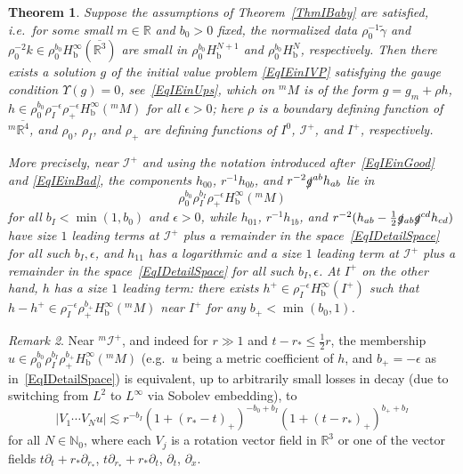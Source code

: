 \documentclass[reqno,11pt,letterpaper]{amsart}
\numberwithin{equation}{section}
\numberwithin{figure}{section}
\newtheorem{thm}{Theorem}[section]
\theoremstyle{definition}
\theoremstyle{remark}
\newtheorem{rmk}[thm]{Remark}
\newcommand{\ms}{\mathscr}
\newcommand{\scri}{\ms I}
\newcommand{\N}{\mathbb{N}}
\newcommand{\R}{\mathbb{R}}
\newcommand{\slg}{\slashed{g}{}}
\newcommand{\Ups}{\Upsilon}
\newcommand{\eps}{\epsilon}
\newcommand{\ol}{\overline}
\newcommand{\pa}{\partial}
\newcommand{\wt}{\widetilde}
\newcommand{\bop}{{\mathrm{b}}}
\newcommand{\half}{\tfrac{1}{2}}
\newcommand{\Hb}{H_{\bop}}
\newcommand{\usref}[1]{{\upshape\ref{#1}}}
\begin{document}
\begin{thm}
\label{ThmIDetail}
  Suppose the assumptions of Theorem~\usref{ThmIBaby} are satisfied, i.e.\ for some small $m\in\R$ and $b_0>0$ fixed, the normalized data $\rho_0^{-1}\wt\gamma$ and $\rho_0^{-2}k\in\rho_0^{b_0}\Hb^\infty(\ol{\R^3})$ are small in $\rho_0^{b_0}\Hb^{N+1}$ and $\rho_0^{b_0}\Hb^N$, respectively. Then there exists a solution $g$ of the initial value problem \eqref{EqIEinIVP} satisfying the gauge condition $\Ups(g)=0$, see~\eqref{EqIEinUps}, which on ${}^m\!M$ is of the form $g=g_m+\rho h$, $h\in\rho_0^{b_0}\rho_I^{-\eps}\rho_+^{-\eps}\Hb^\infty({}^m\!M)$ for all $\eps>0$; here $\rho$ is a boundary defining function of ${}^m\ol{\R^4}$, and $\rho_0$, $\rho_I$, and $\rho_+$ are defining functions of $I^0$, $\scri^+$, and $I^+$, respectively.
  
  More precisely, near $\scri^+$ and using the notation introduced after~\eqref{EqIEinGood} and \eqref{EqIEinBad}, the components $h_{0 0}$, $r^{-1}h_{0 b}$, and $r^{-2}\slg^{a b}h_{a b}$ lie in
  \begin{equation}
  \label{EqIDetailSpace}
    \rho_0^{b_0}\rho_I^{b_I}\rho_+^{-\eps}\Hb^\infty({}^m\!M)
  \end{equation}
  for all $b_I<\min(1,b_0)$ and $\eps>0$, while $h_{0 1}$, $r^{-1}h_{1 b}$, and $r^{-2}(h_{a b}-\half\slg_{a b}\slg^{c d}h_{c d})$ have size $1$ leading terms at $\scri^+$ plus a remainder in the space~\eqref{EqIDetailSpace} for all such $b_I,\eps$, and $h_{1 1}$ has a logarithmic and a size $1$ leading term at $\scri^+$ plus a remainder in the space~\eqref{EqIDetailSpace} for all such $b_I,\eps$. At $I^+$ on the other hand, $h$ has a size $1$ leading term: there exists $h^+\in\rho_I^{-\eps}\Hb^\infty(I^+)$ such that $h-h^+\in\rho_I^{-\eps}\rho_+^{b_+}\Hb^\infty({}^m\!M)$ near $I^+$ for any $b_+<\min(b_0,1)$.
\end{thm}

\begin{rmk}
\label{RmkIDetailDecay}
  Near ${}^m\scri^+$, and indeed for $r\gg 1$ and $t-r_*\leq\half r$, the membership $u\in\rho_0^{b_0}\rho_I^{b_I}\rho_+^{b_+}\Hb^\infty({}^m\!M)$ (e.g.\ $u$ being a metric coefficient of $h$, and $b_+=-\eps$ as in~\eqref{EqIDetailSpace}) is equivalent, up to arbitrarily small losses in decay (due to switching from $L^2$ to $L^\infty$ via Sobolev embedding), to
  \[
    |V_1\cdots V_N u| \lesssim r^{-b_I}(1+(r_*-t)_+)^{-b_0+b_I} (1+(t-r_*)_+)^{b_++b_I}
  \]
  for all $N\in\N_0$, where each $V_j$ is a rotation vector field in $\R^3$ or one of the vector fields $t\pa_t+r_*\pa_{r_*}$, $t\pa_{r_*}+r_*\pa_t$, $\pa_t$, $\pa_x$.
\end{rmk}
\end{document}

